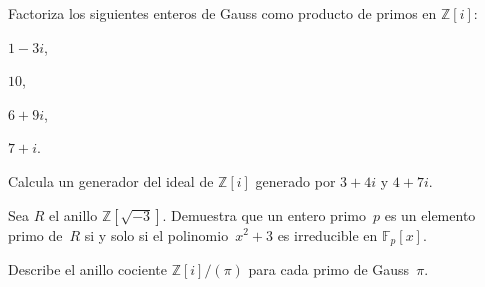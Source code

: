 \documentclass[12pt]{article}
\begin{document}

    
    
    
    
    
    
    
    
    \begin{exercise}[12.5.1]
        Factoriza los siguientes enteros de Gauss como producto de primos en $\mathbb{Z}[i]$: 
        \begin{inparaenum}[\bfseries(a)]
            \item $1-3i$,
            \item $10$,
            \item $6+9i$,
            \item $7+i$.
        \end{inparaenum}
    \end{exercise}
    
    \begin{exercise}[12.5.3]
        Calcula un generador del ideal de $\mathbb{Z}[i]$ generado por $3+4i$ y $4+7i$.
    \end{exercise}
    
    \begin{exercise}[12.5.6]
        Sea $R$ el anillo $\mathbb{Z}[\sqrt{-3}]$. Demuestra que un entero primo~$p$ es un elemento primo de~$R$ si y solo si el polinomio~$x^{2}+3$ es irreducible en $\mathbb{F}_{p}[x]$.
    \end{exercise}
    
    \begin{exercise}[12.5.7]
        Describe el anillo cociente $\mathbb{Z}[i]/(\pi)$ para cada primo de Gauss~$\pi$.
    \end{exercise}
    
\end{document}
